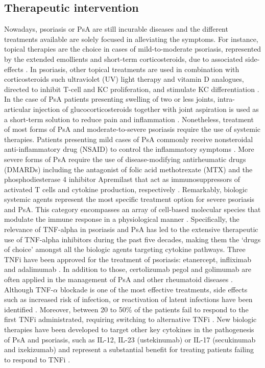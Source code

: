 \subsection{Therapeutic intervention}
Nowadays, psoriasis or PsA are still incurable diseases and the different treatments available are solely focused in alleviating the symptoms. For instance, topical therapies are the choice in cases of mild-to-moderate psoriasis, represented by the extended emollients and short-term corticosteroids, due to associated side-effects \parencite{Menter2009}. In psoriasis, other topical treatments are used in combination with corticosteroids such ultraviolet (UV) light therapy and vitamin D analogues, directed to inhibit T-cell and KC proliferation, and stimulate KC differentiation \parencite{Rizova2001}. In the case of PsA patients presenting swelling of two or less joints, intra-articular injection of glucocorticosteroids together with joint aspiration is used as a short-term solution to reduce pain and inflammation \parencite{Coates2016}. Nonetheless, treatment of most forms of PsA and moderate-to-severe psoriasis require the use of systemic therapies. Patients presenting mild cases of PsA commonly receive nonsteroidal anti-inflammatory drug (NSAID) to control the inflammatory symptoms \parencite{Coates2016}. More severe forms of PsA require the use of disease-modifying antirheumatic drugs (DMARDs) including the antagonist of folic acid methotrexate (MTX) and the phosphodiesterase 4 inhibitor Apremilast that act as immunosuppressors of activated T cells and cytokine production, respectively \parencite{Schmitt2014, Gossec2016, Keating2017,Polachek2017}.
Remarkably, biologic systemic agents represent the most specific treatment option for severe psoriasis and PsA. This category encompasses an array of cell-based molecular species that modulate the immune response in a physiological manner \parencite{Perera2012}. Specifically, the relevance of TNF-alpha in psoriasis and PsA has led to the extensive therapeutic use of TNF-alpha inhibitors during the past five decades, making them the ‘drugs of choice’ amongst all the biologic agents targeting cytokine pathways. Three TNFi have been approved for the treatment of psoriasis: etanercept, infliximab and adalimumab \parencite{Ahil2016}. In addition to those, certolizumab pegol and golimumab are often applied in the management of PsA and other rheumatoid diseases \parencite{Coates2016b}. Although TNF-$\alpha$ blockade is one of the most effective treatments, side effects such as increased risk of infection, or reactivation of latent infections have been identified \parencite{Nickoloff2004}. Moreover, between 20 to 50\% of the patients fail to respond to the first TNFi administrated, requiring switching to alternative TNFi \parencite{Abramson2016}. New biologic therapies have been developed to target other key cytokines in the pathogenesis of PsA and psoriasis, such as IL-12, IL-23 (ustekinumab) or IL-17 (secukinumab and ixekizumab) and represent a substantial benefit for treating patients failing to respond to TNFi \parencite{Mahil2016, Coates2016b}.

